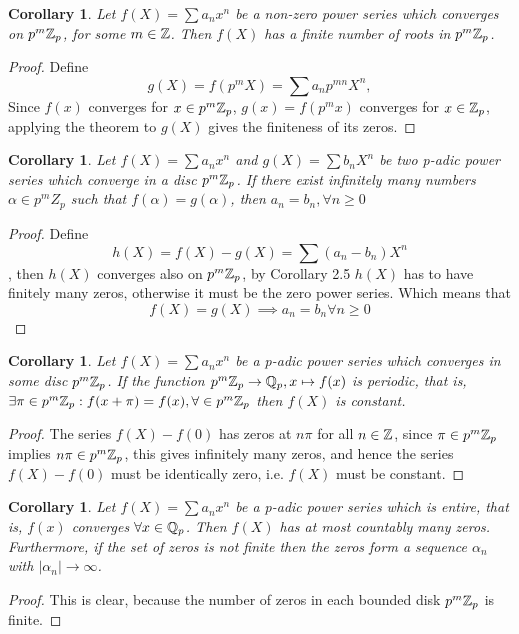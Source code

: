 \documentclass[a4paper]{article}
\theoremstyle{plain}
\newtheorem{Cor}[thm]{Corollary}
\theoremstyle{definition}
\begin{document}
\begin{Cor}
  Let $f(X) = \sum a_{n}x^{n}$ be a non-zero power series which converges on $p^{m}\Bbb Z_{p}$, for some $m \in \Bbb Z$. Then $f(X)$ has a finite number of roots in $p^{m} \Bbb Z_{p}$.
\end{Cor}
\begin{proof}
  Define $$g(X) = f(p^{m}X) = \sum a_{n}p^{mn}X^{n},$$
  Since $f(x)$ converges for $x \in p^{m}\Bbb Z_{p}$, $g(x) = f(p^{m}x)$ converges for $x \in \Bbb Z_{p}$, applying the theorem to $g(X)$ gives the finiteness of its zeros.
\end{proof}
\begin{Cor}
  Let $f(X) = \sum a_{n}x^{n}$ and $g(X) = \sum b_{n}X^{n}$ be two p-adic power series which converge in a disc $p^{m}\Bbb Z_{p}$. If there exist infinitely many numbers $\alpha \in p^{m}Z_{p}$ such that $f(\alpha) = g(\alpha)$, then $a_{n} = b_{n}, \forall n \geq 0$
\end{Cor}
\begin{proof}
  Define $$h(X) = f(X) - g(X) = \sum(a_{n}-b_{n})X^{n}$$, then $h(X)$ converges also on $p^{m}\Bbb Z_{p}$, by Corollary 2.5 $h(X)$ has to have finitely many zeros, otherwise it must be the zero power series. Which means that
  $$f(X) = g(X) \implies a_{n} = b_{n} \forall n \geq 0$$
\end{proof}
\begin{Cor}
  Let $f(X) = \sum a_{n}x^{n}$ be a p-adic power series which converges in some disc $p^{m}\Bbb Z_{p}$. If the function $p^{m}\Bbb Z_{p} \to \Bbb Q_{p}, x \mapsto f(x)$ is periodic, that is, $\exists \pi \in p^{m}\Bbb Z_{p} : f(x + \pi) = f(x), \forall \in p^{m}\Bbb Z_{p}$ then $f(X)$ is constant.
\end{Cor}
\begin{proof}
The series $f(X) - f(0)$ has zeros at $n\pi$ for all $n \in \Bbb Z$, since $\pi \in p^{m}\Bbb Z_{p}$ implies $n\pi \in p^{m}\Bbb Z_{p}$, this gives infinitely many zeros, and hence the series $f(X) - f(0)$ must be identically zero, i.e. $f(X)$ must be constant.
\end{proof}
\begin{Cor}
  Let $f(X) = \sum a_{n}x^{n}$ be a p-adic power series which is entire, that is, $f(x)$ converges $\forall x \in \Bbb Q_{p}$. Then $f(X)$ has at most countably many zeros. Furthermore, if the set of zeros is not finite then the zeros form a sequence $\alpha_{n}$ with $|\alpha_{n}| \to \infty$.
\end{Cor}
\begin{proof}
  This is clear, because the number of zeros in each bounded disk $p^{m}\Bbb Z_{p}$ is finite.
\end{proof}
\end{document}
